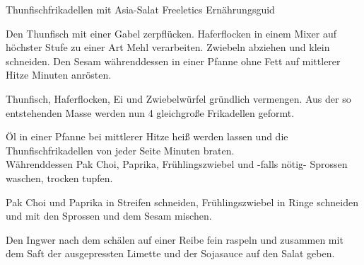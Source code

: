 \begin{recipe}[]{ Thunfischfrikadellen mit Asia-Salat }{ Freeletics Ernährungsguid }



\step
Den Thunfisch mit einer Gabel zerpflücken. Haferflocken in einem Mixer auf höchster Stufe zu einer Art Mehl verarbeiten. Zwiebeln abziehen und klein schneiden. Den Sesam währenddessen in einer Pfanne ohne Fett auf mittlerer Hitze  Minuten anrösten. 

\step
Thunfisch, Haferflocken, Ei und Zwiebelwürfel gründlich vermengen. Aus der so entstehenden Masse werden nun 4 gleichgroße Frikadellen geformt. 

\step 
Öl in einer Pfanne bei mittlerer Hitze heiß werden lassen und die Thunfischfrikadellen von jeder Seite  Minuten braten.\\ 
Währenddessen Pak Choi, Paprika, Frühlingszwiebel und -falls nötig- Sprossen waschen, trocken tupfen.


\step
Pak Choi und Paprika in Streifen schneiden, Frühlingszwiebel in Ringe schneiden und mit den Sprossen und dem Sesam mischen. 

\step 
Den Ingwer nach dem schälen auf einer Reibe fein raspeln und zusammen mit dem Saft der ausgepressten Limette und der Sojasauce auf den Salat geben.


\end{recipe}